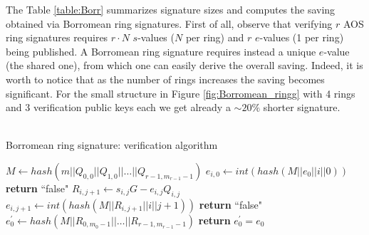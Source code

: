 \begin{center}
	\noindent
	\label{table:Borr}
\end{center}
The Table \ref{table:Borr} summarizes signature sizes and computes the saving obtained via Borromean ring signatures.
First of all, observe that verifying $r$ AOS ring signatures requires $r\cdot N$ $s$-values ($N$ per ring) and $r$ $e$-values (1 per ring) being published. A Borromean ring signature requires instead a unique $e$-value (the shared one), from which one can easily derive the overall saving. Indeed, it is worth to notice that as the number of rings increases the saving becomes significant. For the small structure in Figure \ref{fig:Borromean_ringg} with 4 rings and 3 verification public keys each we get already a $\sim 20\%$ shorter signature.\\ \ \\
\begin{algorithm}[H]
	\caption{Borromean ring signature: verification algorithm}
	\label{alg:Borromean_verify}
	\begin{algorithmic}[1]
		\State $M \gets hash(m||Q_{0,0}||Q_{1,0}||\dots||Q_{r-1,m_{r-1}-1})$
		\State $e_{i,0} \gets int(hash(M||e_0||i||0))$
		 
		\State \textbf{return} ``false"
		\EndIf
		\State $R_{i,j+1} \gets s_{i,j}G - e_{i,j}Q_{i,j}$
		\State $e_{i,j+1} \gets int(hash(M||R_{i,j+1}||i||j+1))$
		\State \textbf{return} ``false"
		\EndIf
		\EndIf
		\EndFor
		\EndFor
		\State $e_0^{'} \gets hash(M||R_{0,m_0-1}||\dots||R_{r-1,m_{r-1}-1})$
		\State \textbf{return} $e_0^{'} = e_0$
		\EndProcedure
	\end{algorithmic}
\end{algorithm}

